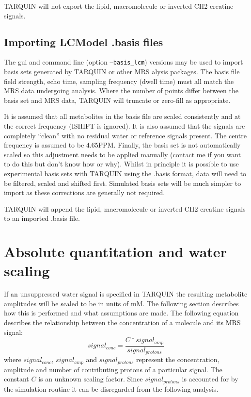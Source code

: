 \documentclass[a4paper,12pt]{article}
\begin{document}
TARQUIN will not export the lipid, macromolecule or inverted CH2 creatine signals.

\subsection{Importing LCModel .basis files}
The gui and command line (option \texttt{---basis\_lcm}) versions may be used to import basis sets generated by TARQUIN or other MRS alysis packages. The basis file field strength, echo time, sampling frequency (dwell time) must all match the MRS data undergoing analysis. Where the number of points differ between the basis set and MRS data, TARQUIN will truncate or zero-fill as appropriate.

It is assumed that all metabolites in the basis file are scaled consistently and at the correct frequency (ISHIFT is ignored). It is also assumed that the signals are completely ``clean'' with no residual water or reference signals present. The centre frequency is assumed to be 4.65PPM. Finally, the basis set is not automatically scaled so this adjustment needs to be applied manually (contact me if you want to do this but don't know how or why). Whilst in principle it is possible to use experimental basis sets with TARQUIN using the .basis format, data will need to be filtered, scaled and shifted first. Simulated basis sets will be much simpler to import as these corrections are generally not required.

TARQUIN will append the lipid, macromolecule or inverted CH2 creatine signals to an imported .basis file.

\section{Absolute quantitation and water scaling}
\label{ws}
If an unsuppressed water signal is specified in TARQUIN the resulting metabolite amplitudes will be scaled to be in units of mM.  The following section describes how this is performed and what assumptions are made.
The following equation describes the relationship between the concentration of a molecule and its MRS signal:
\begin{equation}
signal_{conc} = \frac{C * signal_{amp}}{signal_{protons}}
\end{equation}
where $signal_{conc}$, $signal_{amp}$ and $signal_{protons}$ represent the concentration, amplitude and number of contributing protons of a particular signal. The constant $C$ is an unknown scaling factor. Since $signal_{protons}$ is accounted for by the simulation routine it can be disregarded from the following analysis.
\end{document}
